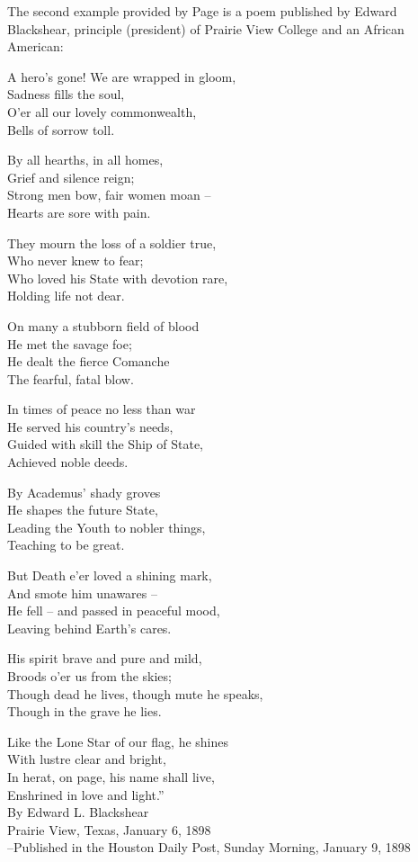 \documentclass[12pt]{article}
\begin{document}
The second example provided by Page is a poem published by Edward Blackshear, principle (president) of Prairie View College and an African American:
\begin{displayquote}
A hero’s gone! We are wrapped in gloom, \\
Sadness fills the soul, \\
O’er all our lovely commonwealth, \\
Bells of sorrow toll. 

By all hearths, in all homes, \\
Grief and silence reign; \\
Strong men bow, fair women moan --\\
Hearts are sore with pain. 

They mourn the loss of a soldier true, \\
Who never knew to fear; \\
Who loved his State with devotion rare, \\
Holding life not dear. 

On many a stubborn field of blood \\
He met the savage foe; \\
He dealt the fierce Comanche \\
The fearful, fatal blow. 

In times of peace no less than war \\
He served his country’s needs, \\
Guided with skill the Ship of State, \\
Achieved noble deeds. 

By Academus’ shady groves \\
He shapes the future State,\\
Leading the Youth to nobler things, \\
Teaching to be great. 

But Death e’er loved a shining mark, \\
And smote him unawares -- \\
He fell -- and passed in peaceful mood, \\
Leaving behind Earth’s cares. 

His spirit brave and pure and mild, \\
Broods o’er us from the skies; \\
Though dead he lives, though mute he speaks, \\
Though in the grave he lies. 

Like the Lone Star of our flag, he shines \\
With lustre clear and bright, \\
In herat, on page, his name shall live, \\
Enshrined in love and light.” \\

By Edward L. Blackshear \\
Prairie View, Texas, January 6, 1898 \\

--Published in the Houston Daily Post, Sunday Morning, January 9, 1898 \cite{hpost:1898-01-09}
\end{displayquote}
\end{document}
